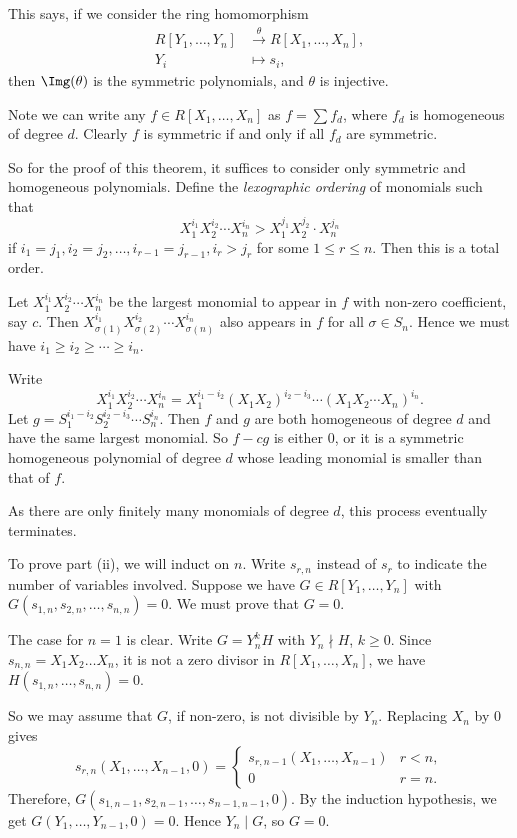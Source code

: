 \documentclass[12pt]{article}
\begin{document}
This says, if we consider the ring homomorphism
\begin{align*}
	R[Y_1, \ldots, Y_n] &\overset{\theta}{\to} R[X_1, \ldots, X_n],\\
	Y_i &\mapsto s_i,
\end{align*}
then $\Img(\theta)$ is the symmetric polynomials, and $\theta$ is injective.


\begin{proofbox}
	Note we can write any $f \in R[X_1, \ldots, X_n]$ as $f = \sum f_d$, where $f_d$ is homogeneous of degree $d$. Clearly $f$ is symmetric if and only if all $f_d$ are symmetric.

	So for the proof of this theorem, it suffices to consider only symmetric and homogeneous polynomials. Define the \emph{lexographic ordering} of monomials such that
	\[
	X_1^{i_1}X_2^{i_2}\cdots X_n^{i_n} > X_1^{j_1} X_2^{j_2} \cdot X_n^{j_n}
	\]
	if $i_1 = j_1, i_2 = j_2, \ldots, i_{r-1} = j_{r-1}, i_r > j_r$ for some $1 \leq r \leq n$. Then this is a total order.

	Let $X_1^{i_1}X_2^{i_2}\cdots X_n^{i_n}$ be the largest monomial to appear in $f$ with non-zero coefficient, say $c$. Then $X_{\sigma(1)}^{i_1}X_{\sigma(2)}^{i_2}\cdots X_{\sigma(n)}^{i_n}$ also appears in $f$ for all $\sigma \in S_n$. Hence we must have $i_1 \ge i_2 \ge \cdots \ge i_n$.

	Write
	\[
	X_1^{i_1}X_2^{i_2}\cdots X_n^{i_n} = X_1^{i_1-i_2}(X_1X_2)^{i_2-i_3}\cdots (X_1X_2\cdots X_n)^{i_n}.
	\]
	Let $g = S_1^{i_1-i_2}S_2^{i_2-i_3}\cdots S_n^{i_n}$. Then $f$ and $g$ are both homogeneous of degree $d$ and have the same largest monomial. So $f - cg$ is either $0$, or it is a symmetric homogeneous polynomial of degree $d$ whose leading monomial is smaller than that of $f$.

	As there are only finitely many monomials of degree $d$, this process eventually terminates.

	To prove part (ii), we will induct on $n$. Write $s_{r,n}$ instead of $s_r$ to indicate the number of variables involved. Suppose we have $G \in R[Y_1, \ldots, Y_n]$ with $G(s_{1,n}, s_{2,n}, \ldots, s_{n,n}) = 0$. We must prove that $G = 0$.

	The case for $n = 1$ is clear. Write $G = Y_n^{k} H$ with $Y_n \nmid H$, $k \geq 0$. Since $s_{n,n} = X_1X_2 \ldots X_n$, it is not a zero divisor in $R[X_1, \ldots, X_n]$, we have $H(s_{1,n}, \ldots, s_{n,n}) = 0$.

	So we may assume that $G$, if non-zero, is not divisible by $Y_n$. Replacing $X_n$ by $0$ gives
	\[
	s_{r,n}(X_1,\ldots, X_{n-1},0)=
	\begin{cases}
		s_{r,n-1}(X_1,\ldots,X_{n-1}) &r<n,\\
		0 &r=n.
	\end{cases}
	\]
	Therefore, $G(s_{1,n-1},s_{2,n-1},\ldots,s_{n-1,n-1},0)$. By the induction hypothesis, we get $G(Y_1, \ldots, Y_{n-1},0) = 0$. Hence $Y_n \mid G$, so $G = 0$.
	
\end{proofbox}
\end{document}
